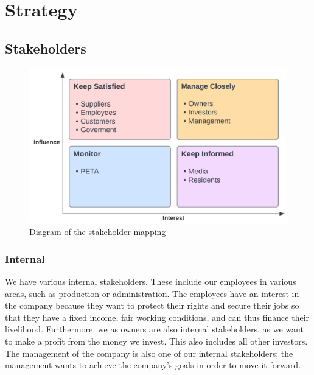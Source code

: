 \chapter{Strategy} \label{strategy}
\section{Stakeholders}
\begin{figure}[!ht]
  \centering
  \includegraphics[width=0.8\linewidth]{./images/stakeholders.png}
  \caption[Stakeholder mapping made with lucidchart.com]{Diagram of the stakeholder mapping}
  \label{fig:stakeholders}
\end{figure}

\subsection{Internal}
We have various internal stakeholders. These include our employees in various areas, such as production or administration. The employees have an interest in the company because they want to protect their rights and secure their jobs so that they have a fixed income, fair working conditions, and can thus finance their livelihood.
\newline
Furthermore, we as owners are also internal stakeholders, as we want to make a profit from the money we invest. This also includes all other investors.
\newline
The management of the company is also one of our internal stakeholders; the management wants to achieve the company's goals in order to move it forward.
